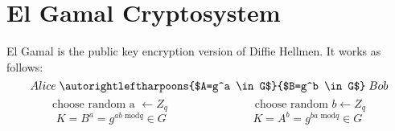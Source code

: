 \documentclass{scribe}
\begin{document}
\vspace{10mm}


\section{El Gamal Cryptosystem}
El Gamal is the public key encryption version of Diffie Hellmen. It works as follows:
$$ Alice \;\autorightleftharpoons{$A=g^a \in G$}{$B=g^b \in G$}\; Bob $$
$$ \text{choose random a }\leftarrow Z_q \;\hspace{3cm}\; \text{choose random }b \leftarrow Z_q $$
$$ K = B^a = g^{ab\text{ mod}q} \in G \;\hspace{3cm}\; K = A^b = g^{ba\text{ mod}q} \in G $$
\end{document}
